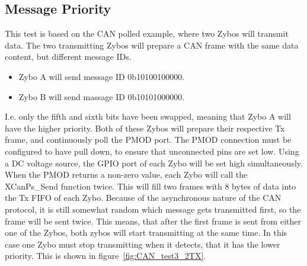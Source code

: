 \subsection{Message Priority}\label{sub:CAN_message priority}
This test is based on the CAN polled example, where two Zybos will transmit data.
The two transmitting Zybos will prepare a CAN frame with the same data content, but different message IDs.
\begin{itemize}
	\item Zybo A will send message ID 0b10100100000.
	\item Zybo B will send massage ID 0b10101000000.
\end{itemize}
I.e. only the fifth and sixth bits have been swapped, meaning that Zybo A will have the higher priority.
Both of these Zybos will prepare their respective Tx frame, and continuously poll the PMOD port.
The PMOD connection must be configured to have pull down, to ensure that unconnected pins are set low.
Using a DC voltage source, the GPIO port of each Zybo will be set high simultaneously.\\

When the PMOD returns a non-zero value, each Zybo will call the XCanPs\_Send function twice.
This will fill two frames with 8 bytes of data into the Tx FIFO of each Zybo. 
Because of the asynchronous nature of the CAN protocol, it is still somewhat random which message gets transmitted first, so the frame will be sent twice. 
This means, that after the first frame is sent from either one of the Zybos, both zybos will start transmitting at the same time. 
In this case one Zybo must stop transmitting when it detects, that it has the lower priority.
This is shown in figure~\ref{fig:CAN_test3_2TX}.\\

